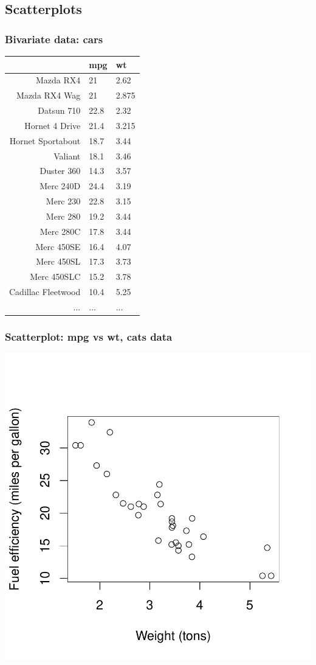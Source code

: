 \documentclass[handout]{beamer}
\numberwithin{equation}{section}
\begin{document}
\subsection{Scatterplots}
%
\begin{frame}
\frametitle{Bivariate data: cars}
\begin{table}[ht]
\centering
\begin{tabular}{rll}
  \hline
 & mpg & wt \\ 
  \hline
Mazda RX4 & 21 & 2.62 \\ 
  Mazda RX4 Wag & 21 & 2.875 \\ 
  Datsun 710 & 22.8 & 2.32 \\ 
  Hornet 4 Drive & 21.4 & 3.215 \\ 
  Hornet Sportabout & 18.7 & 3.44 \\ 
  Valiant & 18.1 & 3.46 \\ 
  Duster 360 & 14.3 & 3.57 \\ 
  Merc 240D & 24.4 & 3.19 \\ 
  Merc 230 & 22.8 & 3.15 \\ 
  Merc 280 & 19.2 & 3.44 \\ 
  Merc 280C & 17.8 & 3.44 \\ 
  Merc 450SE & 16.4 & 4.07 \\ 
  Merc 450SL & 17.3 & 3.73 \\ 
  Merc 450SLC & 15.2 & 3.78 \\ 
  Cadillac Fleetwood & 10.4 & 5.25 \\ 
  ... & ... & ... \\ 
   \hline
\end{tabular}
\end{table}\end{frame}

\begin{frame}
\frametitle{Scatterplot: mpg vs wt, cats data}
\includegraphics{ch3part1-005}
\end{frame}
\end{document}
